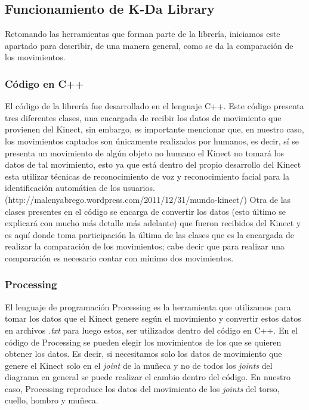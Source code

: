\documentclass[letterpaper]{article}
\begin{document}
\subsection{Funcionamiento de K-Da Library}

Retomando las herramientas que forman parte de la librería, iniciamos este apartado para describir, de una manera general, como se da la comparación de los movimientos.

\subsubsection{Código en C++}

El código de la librería fue desarrollado en el lenguaje C++. Este código presenta tres diferentes clases, una encargada de recibir los datos de movimiento que provienen del Kinect, sin embargo, es importante mencionar que, en nuestro caso, los movimientos captados son únicamente realizados por humanos, es decir, sí se presenta un movimiento de algún objeto no humano el Kinect no tomará los datos de tal movimiento,
esto ya que está dentro del propio desarrollo del Kinect esta utilizar técnicas de reconocimiento de voz y reconocimiento facial para la identificación automática de los usuarios. (http://malenyabrego.wordpress.com/2011/12/31/mundo-kinect/) Otra de las clases presentes en el código se encarga de convertir los datos (esto último se explicará con mucho más detalle más adelante) que fueron 
recibidos del Kinect y es aquí donde toma participación la última de las clases que es la encargada de realizar la comparación de los movimientos; cabe decir que para realizar una comparación es necesario contar con mínimo dos movimientos.

\subsubsection{Processing}

El lenguaje de programación Processing es la herramienta que utilizamos para tomar los datos que el Kinect genere según el movimiento y convertir estos datos en archivos \textit{.txt} para luego estos, ser utilizados dentro del código en C++. En el código de Processing se pueden elegir 
los movimientos de los que se quieren obtener los datos. Es decir, si necesitamos solo los datos de movimiento que genere el Kinect solo en el \textit{joint} de la muñeca y no de todos los \textit{joints} del diagrama en general se puede realizar el cambio dentro del código. En nuestro caso, 
Processing reproduce los datos del movimiento de los \textit{joints} del torso, cuello, hombro y muñeca. 
\end{document}
